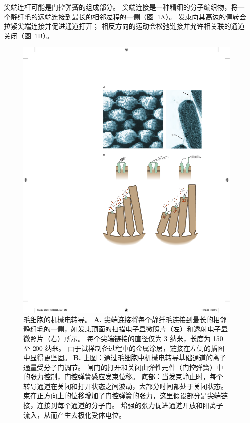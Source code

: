 尖端连杆可能是门控弹簧的组成部分。
尖端连接是一种精细的分子编织物，将一个静纤毛的远端连接到最长的相邻过程的一侧（图~\ref{fig:26_8}A）。
发束向其高边的偏转会拉紧尖端连接并促进通道打开； 相反方向的运动会松弛链接并允许相关联的通道关闭（图~\ref{fig:26_8}B）。


\begin{figure}[htbp]
	\centering
	\includegraphics[width=0.85\linewidth]{chap26/fig_26_8}
	\caption{毛细胞的机械电转导。
		\textbf{A.} 尖端连接将每个静纤毛连接到最长的相邻静纤毛的一侧，如发束顶面的扫描电子显微照片（左）和透射电子显微照片（右）所示。
		每个尖端链接的直径仅为 3 纳米，长度为 150 至 200 纳米。
		由于试样制备过程中的金属涂层，链接在左侧的插图中显得更坚固\cite{assad1991tip,hudspeth1994pulling}。
		\textbf{B.} 上图：通过毛细胞中机械电转导基础通道的离子通量受分子门调节。
		闸门的打开和关闭由弹性元件（门控弹簧）中的张力控制，门控弹簧感应发束位移\cite{howard1988compliance}。
		底部：当发束静止时，每个转导通道在关闭和打开状态之间波动，大部分时间都处于关闭状态。
		束在正方向上的位移增加了门控弹簧的张力，这里假设部分是尖端链接，连接到每个通道的分子门。
		增强的张力促进通道开放和阳离子流入，从而产生去极化受体电位\cite{hudspeth1989ear}。}
	\label{fig:26_8}
\end{figure}


